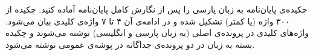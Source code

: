
چکیده‌ی پایان‌نامه به زبان پارسی را پس از نگارش کامل پایان‌نامه آماده کنید. چکیده از ۳۰۰ واژه (یا کمتر) تشکیل شده و در ادامه‌ی آن ۴ تا ۷ واژه‌ی کلیدی بیان می‌شود. واژه‌های کلیدی در پرونده‌ی اصلی (به زبان پارسی و انگلیسی) نوشته می‌شوند و چکیده بسته به زبان در دو پرونده‌ی جداگانه در پوشه‌ی عمومی نوشته می‌شود.
